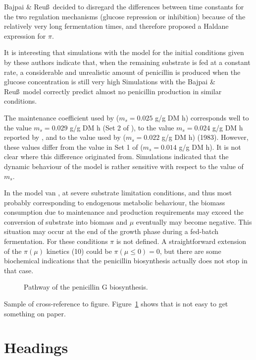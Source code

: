 \documentclass{kluwer}    %
\begin{document}
\begin{article}
Bajpai \& Reu\ss\ decided to disregard the
differences between time constants for the two regulation mechanisms
(glucose repression or inhibition) because of the
relatively very long fermentation times, and therefore proposed a Haldane
expression for $\pi$.

It is interesting that simulations with the \cite{Bunt} model for the
initial conditions given by these authors indicate that, when the
remaining substrate is fed at a constant rate, a considerable and 
unrealistic amount of penicillin is 
produced when the glucose concentration is still very high \cite{CarberryCL88}
Simulations with the Bajpai \& Reu\ss\ model correctly predict almost        
no penicillin production in similar conditions.


The maintenance coefficient used by \cite{Bunt} 
($m_{s}=0.025$ g/g DM h) corresponds well to
the value $m_{s}=0.029$ g/g DM h (Set 2 of \cite{BuchananRBES}), to the 
value $m_{s}=0.024$ g/g DM h reported by \citeauthor{MMI2-d3}, and to the
value used by  ($m_{s}=0.022$ g/g DM h) (1983).
However, these values differ from the value in Set 1 of 
\cite{BuchananRBES} ($m_{s}=0.014$ g/g DM h). 
It is not clear where this difference originated from.
Simulations indicated that the dynamic behaviour of the model is rather
sensitive with respect to the value of $m_{s}$.

In the model van , at severe substrate limitation conditions, and thus most probably corresponding
to endogenous metabolic behaviour, the biomass consumption due to maintenance
and production requirements may exceed the conversion of substrate into
biomass and $\mu$ eventually may become negative. This situation may occur at
the end of the growth phase during a fed-batch fermentation.
For these conditions $\pi$ is not defined. A
straightforward extension of the $\pi(\mu)$ kinetics (10)
could be $\pi(\mu \leq 0)=0$, but there
are some biochemical indications that 
the penicillin biosynthesis actually does not stop in that case. 

\begin{figure} %
\vspace{6pc}
\caption[]{Pathway of the penicillin G biosynthesis.}
\label{penG}
\end{figure}

Sample of cross-reference to figure.
Figure~\ref{penG} shows that is not easy to get something on paper.



\section{Headings}


\end{article}
\end{document}
